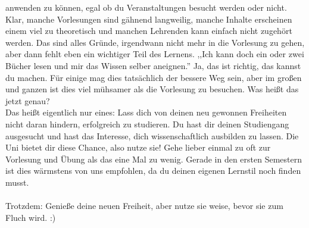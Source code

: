 anwenden zu können, egal ob du Veranstaltungen besucht werden oder
nicht. Klar, manche Vorlesungen sind gähnend langweilig, manche Inhalte
erscheinen einem viel zu theoretisch und manchen Lehrenden kann einfach nicht zugehört werden. 
Das sind alles Gründe, irgendwann nicht mehr in die Vorlesung zu gehen, aber dann fehlt eben ein wichtiger Teil des Lernens. 
,,Ich kann doch ein oder zwei Bücher lesen und mir das Wissen selber aneignen.''
 Ja, das ist richtig, das kannst du machen. Für einige mag dies tatsächlich der bessere Weg sein, aber im großen und ganzen ist dies viel mühsamer als die Vorlesung zu besuchen.       
        Was heißt das jetzt genau? \\
Das heißt eigentlich nur eines: Lass dich von deinen neu gewonnen Freiheiten nicht daran hindern, erfolgreich zu studieren. Du hast dir deinen Studiengang ausgesucht und hast das Interesse, dich wissenschaftlich ausbilden zu lassen. Die Uni bietet dir diese Chance, also nutze sie!
        Gehe lieber einmal zu oft zur Vorlesung und Übung als das eine Mal zu
	wenig. Gerade in den ersten Semestern ist dies wärmstens von uns
	empfohlen, da du deinen eigenen Lernstil noch finden
	musst.\\\\
        Trotzdem: Genieße deine neuen Freiheit, aber nutze sie weise, bevor sie
        zum Fluch wird. :)
